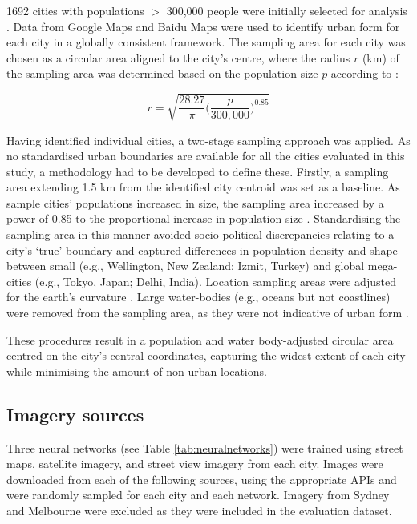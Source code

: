 \documentclass[urbansci,article,submit,moreauthors,pdftex]{Definitions/mdpi}
\begin{document}
1692 cities with populations $>$ 300,000 people were initially selected for analysis \citep{UN2014}. Data from Google Maps and Baidu Maps were used to identify urban form for each city in a globally consistent framework. The sampling area for each city was chosen as a circular area aligned to the city's centre, where the radius $r$ (km) of the sampling area was determined based on the population size $p$ according to \citet{Barthelemy2016}: 

\begin{equation}
r = \sqrt{ \frac{28.27}{\pi} \bigg( \frac{p}{300,000}  \bigg)^{0.85} }
\end{equation}

Having identified individual cities, a two-stage sampling approach was applied. As no standardised urban boundaries are available for all the cities evaluated in this study, a methodology had to be developed to define these. Firstly, a sampling area extending 1.5 km from the identified city centroid \citep{UN2014} was set as a baseline. As sample cities' populations increased in size, the sampling area increased by a power of 0.85 to the proportional increase in population size \citep{Barthelemy2016}. Standardising the sampling area in this manner avoided socio-political discrepancies relating to a city's `true' boundary and captured differences in population density and shape between small (e.g., Wellington, New Zealand; Izmit, Turkey) and global mega-cities (e.g., Tokyo, Japan;  Delhi, India). Location sampling areas were adjusted for the earth's curvature \citep{Sinnott1984}. Large water-bodies (e.g., oceans but not coastlines) were removed from the sampling area, as they were not indicative of urban form . 

These procedures result in a population and water body-adjusted circular area centred on the city's central coordinates, capturing the widest extent of each city while minimising the amount of non-urban locations. 

\label{methodsimagery}
\subsection{Imagery sources}

Three neural networks (see Table \ref{tab:neuralnetworks}) were trained using street maps, satellite imagery, and street view imagery from each city. Images were downloaded from each of the following sources, using the appropriate APIs and were randomly sampled for each city and each network. Imagery from Sydney and Melbourne were excluded as they were included in the evaluation dataset. 
\end{document}

